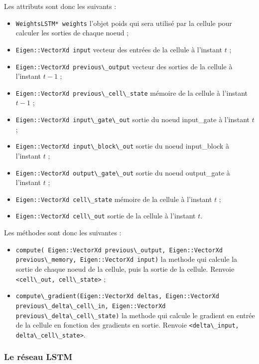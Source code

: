\bigskip

Les attributs sont donc les suivants :

\begin{itemize}
  \item \verb+WeightsLSTM* weights+ l'objet poids qui sera utilisé par la
    cellule pour calculer les sorties de chaque noeud ;
  \item \verb+Eigen::VectorXd input+ vecteur des entrées de la cellule à
    l'instant $t$ ;
  \item \verb+Eigen::VectorXd previous\_output+ vecteur des sorties de la
    cellule à l'instant $t-1$ ;
  \item \verb+Eigen::VectorXd previous\_cell\_state+ mémoire de la cellule
    à l'instant $t-1$ ;
  \item \verb+Eigen::VectorXd input\_gate\_out+ sortie du noeud input\_gate
    à l'instant $t$ ;
  \item \verb+Eigen::VectorXd input\_block\_out+ sortie du noeud input\_block
    à l'instant $t$ ;
  \item \verb+Eigen::VectorXd output\_gate\_out+ sortie du noeud output\_gate
    à l'instant $t$ ;
  \item \verb+Eigen::VectorXd cell\_state+ mémoire de la cellule à
    l'instant $t$ ;
  \item \verb+Eigen::VectorXd cell\_out+ sortie de la cellule à l'instant $t$.
\end{itemize}

Les méthodes sont donc les suivantes :

\begin{itemize}
  \item \verb+compute( Eigen::VectorXd previous\_output, Eigen::VectorXd previous\_memory, Eigen::VectorXd input)+
    la methode qui calcule la sortie de chaque noeud de la cellule, puis la sortie de la
    cellule. Renvoie \verb+<cell\_out, cell\_state>+ ;
  \item \verb+compute\_gradient(Eigen::VectorXd deltas, Eigen::VectorXd previous\_delta\_cell\_in, Eigen::VectorXd previous\_delta\_cell\_state)+
    la methode qui calcule le gradient en entrée de la cellule en fonction des gradients en sortie.
    Renvoie \verb+<delta\_input, delta\_cell\_state>+.
\end{itemize}

\subsubsection{Le réseau LSTM}

